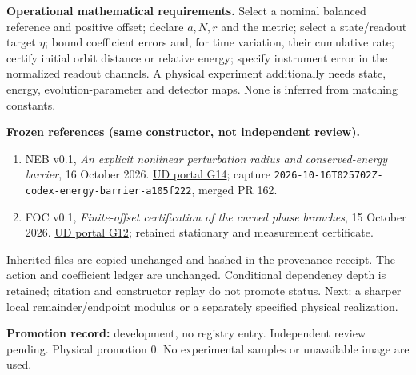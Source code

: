 \documentclass[11pt,a4paper]{article}
\begin{document}
\textbf{Operational mathematical requirements.} Select a nominal balanced reference and positive offset; declare $a,N,r$ and the metric; select a state/readout target $\eta$; bound coefficient errors and, for time variation, their cumulative rate; certify initial orbit distance or relative energy; specify instrument error in the normalized readout channels. A physical experiment additionally needs state, energy, evolution-parameter and detector maps. None is inferred from matching constants.

\textbf{Frozen references (same constructor, not independent review).}
\begin{enumerate}
\item NEB v0.1, \emph{An explicit nonlinear perturbation radius and conserved-energy barrier}, 16 October 2026. \href{https://unified-dynamics-public.ben-w-mayes.chatgpt.site/papers/\#energy-barrier-v01}{UD portal G14}; capture \texttt{2026-10-16T025702Z-codex-energy-barrier-a105f222}, merged PR 162.
\item FOC v0.1, \emph{Finite-offset certification of the curved phase branches}, 15 October 2026. \href{https://unified-dynamics-public.ben-w-mayes.chatgpt.site/papers/\#finite-offset-v01}{UD portal G12}; retained stationary and measurement certificate.
\end{enumerate}
Inherited files are copied unchanged and hashed in the provenance receipt. The action and coefficient ledger are unchanged. Conditional dependency depth is retained; citation and constructor replay do not promote status. Next: a sharper local remainder/endpoint modulus or a separately specified physical realization.

\textbf{Promotion record:} development, no registry entry. Independent review pending. Physical promotion $0$. No experimental samples or unavailable image are used.
\end{document}

